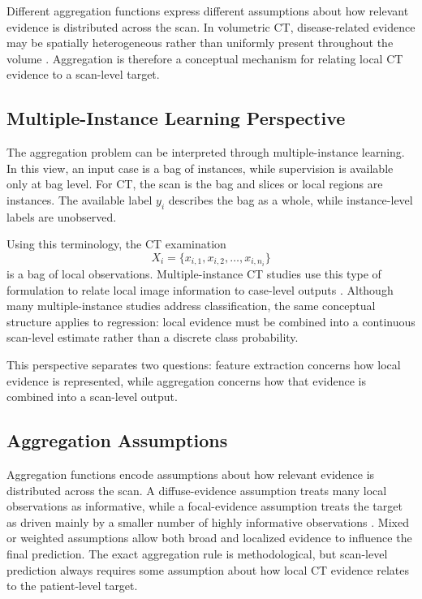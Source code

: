 Different aggregation functions express different assumptions about how relevant evidence is distributed across the scan. In volumetric CT, disease-related evidence may be spatially heterogeneous rather than uniformly present throughout the volume \cite{xue2023copdmil}. Aggregation is therefore a conceptual mechanism for relating local CT evidence to a scan-level target.


\subsection{Multiple-Instance Learning Perspective}
\label{sec:mil_perspective}

The aggregation problem can be interpreted through multiple-instance learning. In this view, an input case is a bag of instances, while supervision is available only at bag level. For CT, the scan is the bag and slices or local regions are instances. The available label \(y_i\) describes the bag as a whole, while instance-level labels are unobserved.

Using this terminology, the CT examination
\[
X_i = \{x_{i,1}, x_{i,2}, \dots, x_{i,n_i}\}
\]
is a bag of local observations. Multiple-instance CT studies use this type of formulation to relate local image information to case-level outputs \cite{qi2021drmil,xue2023copdmil}. Although many multiple-instance studies address classification, the same conceptual structure applies to regression: local evidence must be combined into a continuous scan-level estimate rather than a discrete class probability.

This perspective separates two questions: feature extraction concerns how local evidence is represented, while aggregation concerns how that evidence is combined into a scan-level output.


\subsection{Aggregation Assumptions}
\label{sec:aggregation_assumptions}

Aggregation functions encode assumptions about how relevant evidence is distributed across the scan. A diffuse-evidence assumption treats many local observations as informative, while a focal-evidence assumption treats the target as driven mainly by a smaller number of highly informative observations \cite{qi2021drmil,xue2023copdmil}. Mixed or weighted assumptions allow both broad and localized evidence to influence the final prediction. The exact aggregation rule is methodological, but scan-level prediction always requires some assumption about how local CT evidence relates to the patient-level target.


